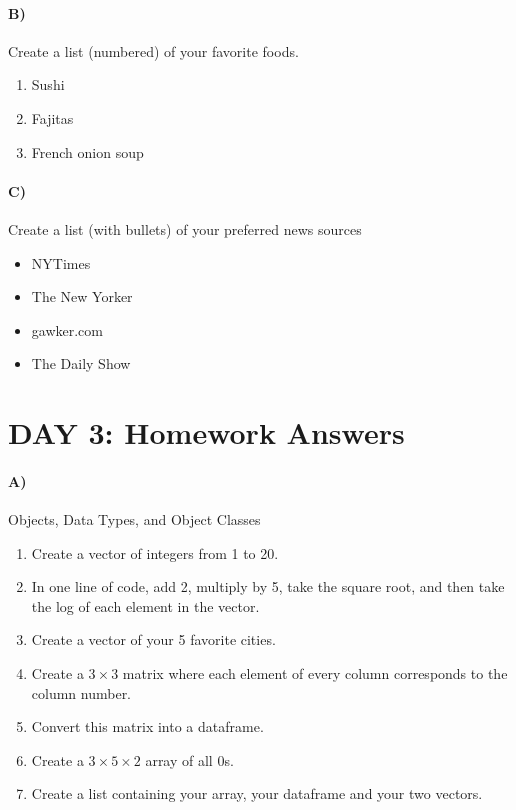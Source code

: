 \documentclass[10pt]{article}
\begin{document}
\paragraph{B)} Create a list (numbered) of your favorite foods.
\begin{enumerate}
\item Sushi
\item Fajitas
\item French onion soup
\end{enumerate}

\paragraph{C)} Create a list (with bullets) of your preferred news sources
\begin{itemize}
\item NYTimes
\item The New Yorker
\item gawker.com
\item The Daily Show
\end{itemize}

\section*{DAY 3: Homework Answers}

\paragraph{A)} Objects, Data Types, and Object Classes

\begin{enumerate}
\item Create a vector of integers from 1 to 20.  
\item In one line of code, add 2, multiply by 5, take the square root, and then take the log of each element in the vector.
\item Create a vector of your 5 favorite cities.
\item Create a $3 \times 3$ matrix where each element of every column corresponds to the column number.
\item Convert this matrix into a dataframe.
\item Create a $3 \times 5 \times 2$ array of all 0s.
\item Create a list containing your array, your dataframe and your two vectors. 
\end{enumerate}
\end{document}
